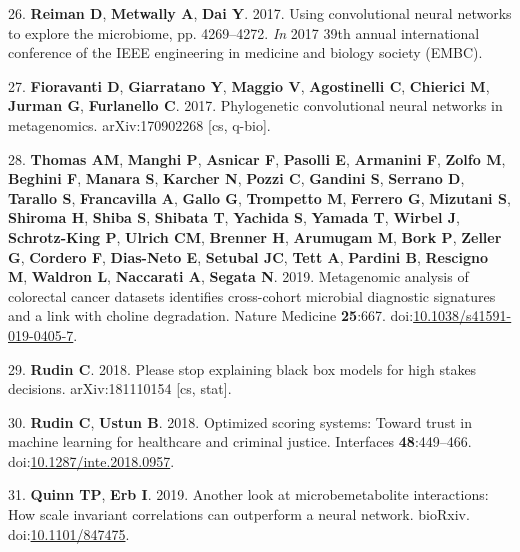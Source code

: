 \documentclass[
  11pt,
]{article}
\begin{document}
\leavevmode\hypertarget{ref-reiman_using_2017}{}%
26. \textbf{Reiman D}, \textbf{Metwally A}, \textbf{Dai Y}. 2017. Using
convolutional neural networks to explore the microbiome, pp. 4269--4272.
\emph{In} 2017 39th annual international conference of the IEEE
engineering in medicine and biology society (EMBC).

\leavevmode\hypertarget{ref-fioravanti_phylogenetic_2017}{}%
27. \textbf{Fioravanti D}, \textbf{Giarratano Y}, \textbf{Maggio V},
\textbf{Agostinelli C}, \textbf{Chierici M}, \textbf{Jurman G},
\textbf{Furlanello C}. 2017. Phylogenetic convolutional neural networks
in metagenomics. arXiv:170902268 {[}cs, q-bio{]}.

\leavevmode\hypertarget{ref-thomas_metagenomic_2019}{}%
28. \textbf{Thomas AM}, \textbf{Manghi P}, \textbf{Asnicar F},
\textbf{Pasolli E}, \textbf{Armanini F}, \textbf{Zolfo M},
\textbf{Beghini F}, \textbf{Manara S}, \textbf{Karcher N}, \textbf{Pozzi
C}, \textbf{Gandini S}, \textbf{Serrano D}, \textbf{Tarallo S},
\textbf{Francavilla A}, \textbf{Gallo G}, \textbf{Trompetto M},
\textbf{Ferrero G}, \textbf{Mizutani S}, \textbf{Shiroma H},
\textbf{Shiba S}, \textbf{Shibata T}, \textbf{Yachida S}, \textbf{Yamada
T}, \textbf{Wirbel J}, \textbf{Schrotz-King P}, \textbf{Ulrich CM},
\textbf{Brenner H}, \textbf{Arumugam M}, \textbf{Bork P}, \textbf{Zeller
G}, \textbf{Cordero F}, \textbf{Dias-Neto E}, \textbf{Setubal JC},
\textbf{Tett A}, \textbf{Pardini B}, \textbf{Rescigno M},
\textbf{Waldron L}, \textbf{Naccarati A}, \textbf{Segata N}. 2019.
Metagenomic analysis of colorectal cancer datasets identifies
cross-cohort microbial diagnostic signatures and a link with choline
degradation. Nature Medicine \textbf{25}:667.
doi:\href{https://doi.org/10.1038/s41591-019-0405-7}{10.1038/s41591-019-0405-7}.

\leavevmode\hypertarget{ref-rudin_please_2018}{}%
29. \textbf{Rudin C}. 2018. Please stop explaining black box models for
high stakes decisions. arXiv:181110154 {[}cs, stat{]}.

\leavevmode\hypertarget{ref-rudin_optimized_2018}{}%
30. \textbf{Rudin C}, \textbf{Ustun B}. 2018. Optimized scoring systems:
Toward trust in machine learning for healthcare and criminal justice.
Interfaces \textbf{48}:449--466.
doi:\href{https://doi.org/10.1287/inte.2018.0957}{10.1287/inte.2018.0957}.

\leavevmode\hypertarget{ref-Quinn847475}{}%
31. \textbf{Quinn TP}, \textbf{Erb I}. 2019. Another look at
microbemetabolite interactions: How scale invariant correlations can
outperform a neural network. bioRxiv.
doi:\href{https://doi.org/10.1101/847475}{10.1101/847475}.
\end{document}
